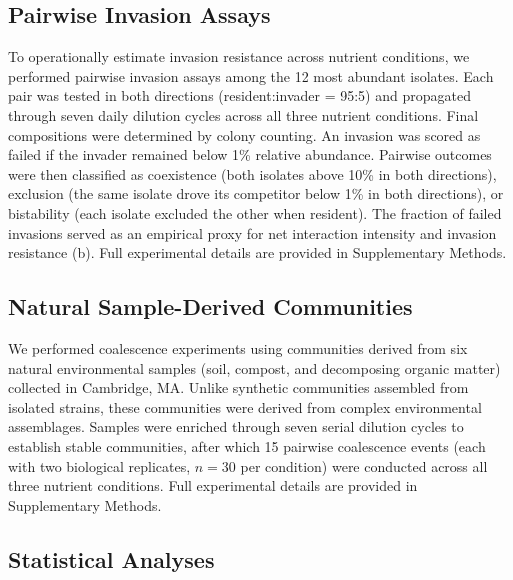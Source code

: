 \subsection*{Pairwise Invasion Assays}
\label{sec:methods:invasion}

To operationally estimate invasion resistance across nutrient conditions, we performed pairwise invasion assays among the 12 most abundant isolates. Each pair was tested in both directions (resident:invader = 95:5) and propagated through seven daily dilution cycles across all three nutrient conditions. Final compositions were determined by colony counting. An invasion was scored as failed if the invader remained below 1\% relative abundance. Pairwise outcomes were then classified as coexistence (both isolates above 10\% in both directions), exclusion (the same isolate drove its competitor below 1\% in both directions), or bistability (each isolate excluded the other when resident). The fraction of failed invasions served as an empirical proxy for net interaction intensity and invasion resistance (b). Full experimental details are provided in Supplementary Methods.



\subsection*{Natural Sample-Derived Communities}
\label{sec:methods:natural}

We performed coalescence experiments using communities derived from six natural environmental samples (soil, compost, and decomposing organic matter) collected in Cambridge, MA. Unlike synthetic communities assembled from isolated strains, these communities were derived from complex environmental assemblages. Samples were enriched through seven serial dilution cycles to establish stable communities, after which 15 pairwise coalescence events (each with two biological replicates, $n = 30$ per condition) were conducted across all three nutrient conditions. Full experimental details are provided in Supplementary Methods.


\subsection*{Statistical Analyses}
\label{sec:methods:statistics}

